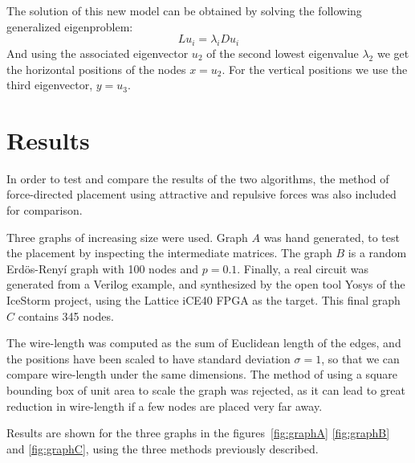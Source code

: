 \documentclass[a4paper,twocolumn]{article}
\begin{document}
The solution of this new model can be obtained by solving the following 
generalized eigenproblem:
%
\begin{equation}
L u_i = \lambda_i D u_i
\end{equation}
%
And using the associated eigenvector $u_2$ of the second lowest eigenvalue 
$\lambda_2$ we get the horizontal positions of the nodes $x = u_2$. For the 
vertical positions we use the third eigenvector, $y = u_3$.

\section{Results}

In order to test and compare the results of the two algorithms, the method of 
force-directed placement \cite{forces} using attractive and repulsive forces was 
also included for comparison.

Three graphs of increasing size were used. Graph $A$ was hand generated, to test 
the placement by inspecting the intermediate matrices. The graph $B$ is a random 
Erdös-Renyí graph with 100 nodes and $p=0.1$. Finally, a real circuit was 
generated from a Verilog example, and synthesized by the open tool Yosys 
\cite{wolf} of the IceStorm project, using the Lattice iCE40 FPGA as the target.  
This final graph $C$ contains 345 nodes.

The wire-length was computed as the sum of Euclidean length of the edges, and 
the positions have been scaled to have standard deviation $\sigma = 1$, so that 
we can compare wire-length under the same dimensions.
%
The method of using a square bounding box of unit area to scale the graph was 
rejected, as it can lead to great reduction in wire-length if a few nodes are 
placed very far away.

Results are shown for the three graphs in the figures~\ref{fig:graphA} 
\ref{fig:graphB} and \ref{fig:graphC}, using the three methods previously 
described.
\end{document}
